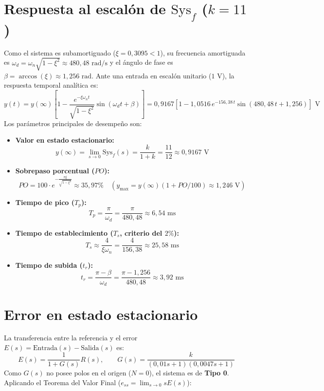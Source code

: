 \documentclass[11pt,a4paper]{article}
\begin{document}
\section{Respuesta al escalón de $\text{Sys}_f$ ($k = 11$)}
Como el sistema es subamortiguado ($\xi = 0,3095 < 1$), su frecuencia amortiguada es $\omega_d = \omega_n\sqrt{1 - \xi^2} \approx 480,48\text{ rad/s}$ y el ángulo de fase es $\beta = \arccos(\xi) \approx 1,256\text{ rad}$. Ante una entrada en escalón unitario ($1\text{ V}$), la respuesta temporal analítica es:
\begin{equation}
    y(t) = y(\infty)\left[1 - \frac{e^{-\xi\omega_n t}}{\sqrt{1 - \xi^2}}\sin(\omega_d t + \beta)\right] = 0,9167\left[1 - 1,0516\,e^{-156,38\,t}\sin(480,48\,t + 1,256)\right]\text{ V}
\end{equation}
Los parámetros principales de desempeño son:
\begin{itemize}
    \item \textbf{Valor en estado estacionario:}
    \begin{equation}
        y(\infty) = \lim_{s \to 0} \text{Sys}_f(s) = \frac{k}{1+k} = \frac{11}{12} \approx 0,9167\text{ V}
    \end{equation}
    \item \textbf{Sobrepaso porcentual ($PO$):}
    \begin{equation}
        PO = 100 \cdot e^{-\frac{\pi\xi}{\sqrt{1-\xi^2}}} \approx 35,97\% \quad \left(y_{\max} = y(\infty)(1 + PO/100) \approx 1,246\text{ V}\right)
    \end{equation}
    \item \textbf{Tiempo de pico ($T_p$):}
    \begin{equation}
        T_p = \frac{\pi}{\omega_d} = \frac{\pi}{480,48} \approx 6,54\text{ ms}
    \end{equation}
    \item \textbf{Tiempo de establecimiento ($T_s$, criterio del $2\%$):}
    \begin{equation}
        T_s \approx \frac{4}{\xi\omega_n} = \frac{4}{156,38} \approx 25,58\text{ ms}
    \end{equation}
    \item \textbf{Tiempo de subida ($t_r$):}
    \begin{equation}
        t_r = \frac{\pi - \beta}{\omega_d} = \frac{\pi - 1,256}{480,48} \approx 3,92\text{ ms}
    \end{equation}
\end{itemize}

\section{Error en estado estacionario}
La transferencia entre la referencia y el error $E(s) = \text{Entrada}(s) - \text{Salida}(s)$ es:
\begin{equation}
    E(s) = \frac{1}{1 + G(s)} R(s), \qquad G(s) = \frac{k}{(0,01 s + 1)(0,0047 s + 1)}
\end{equation}
Como $G(s)$ no posee polos en el origen ($N = 0$), el sistema es de \textbf{Tipo 0}. Aplicando el Teorema del Valor Final ($e_{ss} = \lim_{s \to 0} s E(s)$):
\end{document}
